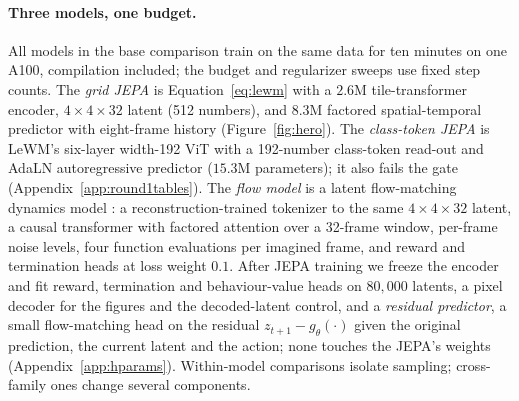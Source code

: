 \paragraph{Three models, one budget.} All models in the base comparison train on the same data for ten minutes on one A100, compilation included; the budget and regularizer sweeps use fixed step counts. The \emph{grid JEPA} is Equation~\ref{eq:lewm} with a
$2.6$M tile-transformer encoder, $4\times4\times32$ latent (512 numbers), and $8.3$M factored
spatial-temporal predictor with eight-frame history (Figure~\ref{fig:hero}). The \emph{class-token JEPA} is LeWM's six-layer width-192 ViT with a 192-number class-token read-out and AdaLN autoregressive predictor ($15.3$M parameters); it also fails the gate (Appendix~\ref{app:round1tables}).
The \emph{flow model} is a latent flow-matching dynamics model
\citep{lipman2023flowmatching,chen2024diffusionforcing,hafner2025dreamer4}: a reconstruction-trained
tokenizer to the same $4\times4\times32$ latent, a causal transformer with factored attention over a
32-frame window, per-frame noise levels, four function evaluations per imagined frame, and reward and
termination heads at loss weight $0.1$. After JEPA training we freeze the encoder and fit reward,
termination and behaviour-value heads on $80{,}000$ latents, a pixel decoder for the figures and the decoded-latent control, and a
\emph{residual predictor}, a small flow-matching head on the residual $z_{t+1}-g_\theta(\cdot)$ given
the original prediction, the current latent and the action; none touches the JEPA's weights
(Appendix~\ref{app:hparams}). Within-model comparisons isolate sampling; cross-family ones change several components.
